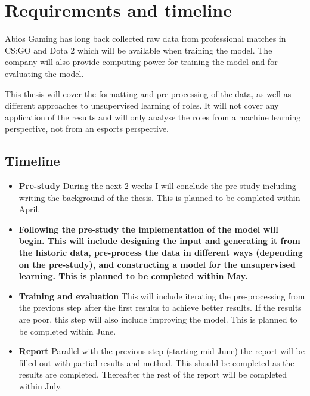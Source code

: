 \documentclass{article}
\begin{document}
\section{Requirements and timeline}
Abios Gaming has long back collected raw data from professional matches in CS:GO and Dota 2 which will be available when training the model. The company will also provide computing power for training the model and for evaluating the model.

This thesis will cover the formatting and pre-processing of the data, as well as different approaches to unsupervised learning of roles. It will not cover any application of the results and will only analyse the roles from a machine learning perspective, not from an esports perspective.

\subsection{Timeline}
\begin{itemize}
\item{\bf Pre-study} During the next 2 weeks I will conclude the pre-study including writing the background of the thesis. This is planned to be completed within April.
\item{\bf Following the pre-study the implementation of the model will begin. This will include designing the input and generating it from the historic data, pre-process the data in different ways (depending on the pre-study), and constructing a model for the unsupervised learning. This is planned to be completed within May.}
\item{\bf Training and evaluation} This will include iterating the pre-processing from the previous step after the first results to achieve better results. If the results are poor, this step will also include improving the model. This is planned to be completed within June.
\item{\bf Report} Parallel with the previous step (starting mid June) the report will be filled out with partial results and method. This should be completed as the results are completed. Thereafter the rest of the report will be completed within July.
\end{itemize}

\cite{patashnik-bibtexing}

{}

\end{document}
